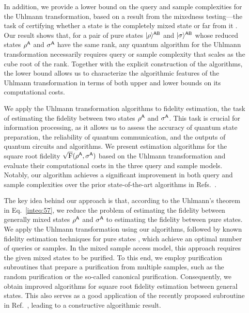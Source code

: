 In addition, we provide a lower bound on the query and sample complexities for the Uhlmann transformation, based on a result from the mixedness testing---the task of certifying whether a state is the completely mixed state or far from it \cite{ODonnell2021SpectrumTesting, MdW16surveyquantproptest, Wright2016howtolearnQS}.
Our result shows that, for a pair of pure states $|\rho\rangle^{{\mathsf{A}}{\mathsf{B}}}$ and $|\sigma\rangle^{{\mathsf{A}}{\mathsf{B}}}$ whose reduced states $\rho^{\mathsf{A}}$ and $\sigma^{\mathsf{A}}$ have the same rank, any quantum algorithm for the Uhlmann transformation necessarily requires query or sample complexity that scales as the cube root of the rank.
Together with the explicit construction of the algorithms, the lower bound allows us to characterize the algorithmic features of the Uhlmann transformation in terms of both upper and lower bounds on its computational costs.



We apply the Uhlmann transformation algorithms to fidelity estimation, the task of estimating the fidelity between two states $\rho^{\mathsf{A}}$ and $\sigma^{\mathsf{A}}$.
This task is crucial for information processing, as it allows us to assess the accuracy of quantum state preparation, the reliability of quantum communication, and the outputs of quantum circuits and algorithms.
We present estimation algorithms for the square root fidelity $\sqrt{{\mathrm{F}}}(\rho^{\mathsf{A}}, \sigma^{\mathsf{A}})$ based on the Uhlmann transformation and evaluate their computational costs in the three query and sample models.
Notably, our algorithm achieves a significant improvement in both query and sample complexities over the prior state-of-the-art algorithms in Refs.~\cite{gilyen2022improvedfidelity, Liu2024geometricmean}.


The key idea behind our approach is that, according to the Uhlmann's theorem in Eq.~\eqref{inteq:57}, we reduce the problem of estimating the fidelity between generally mixed states $\rho^{\mathsf{A}}$ and $\sigma^{\mathsf{A}}$ to estimating the fidelity between pure states.
We apply the Uhlmann transformation using our algorithms, followed by known fidelity estimation techniques for pure states \cite{Wang2024OptimalFidelityPure, wang2024sampleoptimal}, which achieve an optimal number of queries or samples.
In the mixed sample access model, this approach requires the given mixed states to be purified. To this end, we employ purification subroutines that prepare a purification from multiple samples, such as the random purification \cite{tang2025conjugatequerieshelp} or the so-called canonical purification.
Consequently, we obtain improved algorithms for square root fidelity estimation between general states.
This also serves as a good application of the recently proposed subroutine in Ref.~\cite{tang2025conjugatequerieshelp}, leading to a constructive algorithmic result.




